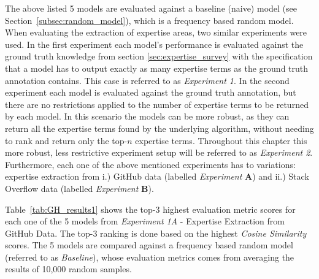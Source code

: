         The above listed 5 models are evaluated against a baseline (naive) model (see Section~\ref{subsec:random_model}), which is a frequency based random model. When evaluating the extraction of expertise areas, two similar experiments were used. In the first experiment each model's performance is evaluated against the ground truth knowledge from section \ref{sec:expertise_survey} with the specification that a model has to output exactly as many expertise terms as the ground truth annotation contains. This case is referred to as \emph{Experiment 1}. In the second experiment each model is evaluated against the ground truth annotation, but there are no restrictions applied to the number of expertise terms to be returned by each model. In this scenario the models can be more robust, as they can return all the expertise terms found by the underlying algorithm, without needing to rank and return only the top-$n$ expertise terms. Throughout this chapter this more robust, less restrictive experiment setup will be referred to as \emph{Experiment 2}. Furthermore, each one of the above mentioned experiments has to variations: expertise extraction from i.) GitHub data (labelled \emph{Experiment} \textbf{A}) and ii.) Stack Overflow data (labelled \emph{Experiment} \textbf{B}). 
        
        Table~\ref{tab:GH_results1} shows the top-$3$ highest evaluation metric scores for each one of the 5 models from \emph{Experiment 1A} - Expertise Extraction from GitHub Data. The top-$3$ ranking is done based on the highest \emph{Cosine Similarity} scores. The 5 models are compared against a frequency based random model (referred to as \emph{Baseline}), whose evaluation metrics comes from averaging the results of 10,000 random samples.  
        
